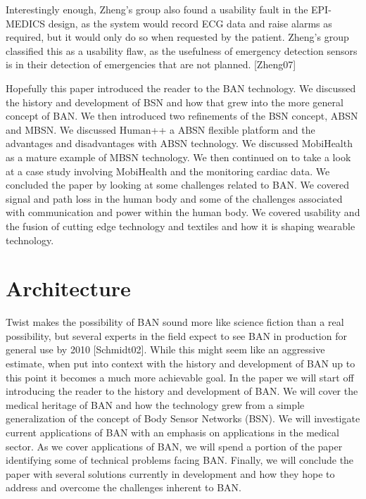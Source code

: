 Interestingly enough, Zheng's group also found a usability fault in the EPI-MEDICS design, as the system would record ECG data and raise alarms as required, but it would only do so when requested by the patient. Zheng's group classified this as a usability flaw, as the usefulness of emergency detection sensors is in their detection of emergencies that are not planned. [Zheng07] 

Hopefully this paper introduced the reader to the BAN technology. We discussed the history and development of BSN and how that grew into the more general concept of BAN. We then introduced two refinements of the BSN concept, ABSN and MBSN. We discussed Human++ a ABSN flexible platform and the advantages and disadvantages with ABSN technology. We discussed MobiHealth as a mature example of MBSN technology. We then continued on to take a look at a case study involving MobiHealth and the monitoring cardiac data. We concluded the paper by looking at some challenges related to BAN. We covered signal and path loss in the human body and some of the challenges associated with communication and power within the human body. We covered usability and the fusion of  cutting edge technology and textiles and how it is shaping wearable technology. 

\section{Architecture}
Twist makes the possibility of BAN sound more like science fiction than a real possibility, but several experts in the field expect to see BAN in production for general use by 2010 [Schmidt02]. While this might seem like an aggressive estimate, when put into context with the history and development of BAN up to this point it becomes a much more achievable goal. In the paper we will start off introducing the reader to the history and development of BAN. We will cover the medical heritage of BAN and how the technology grew from a simple generalization of the concept of Body Sensor Networks (BSN). We will investigate current applications of BAN with an emphasis on applications in the medical sector. As we cover applications of BAN, we will spend a portion of the paper identifying some of technical problems facing BAN. Finally, we will conclude the paper with several solutions currently in development and how they hope to address and overcome the challenges inherent to BAN.

